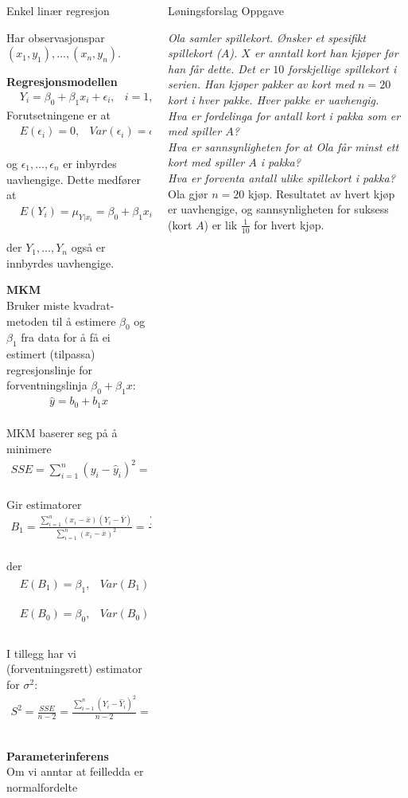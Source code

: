 \documentclass[final,hyperref={pdfpagelabels=false}]{beamer}
\newcommand{\oppgave}[2]
{\center\normalsize Oppgave\\
	{\footnotesize\raggedright \textit{#1}\\#2\\}}
\newcommand{\matte}[1]{\vspace{-3mm}\begin{align*}#1\end{align*}}
\newcommand{\maths}[1]{\vspace{-3mm}\begin{align*}#1\end{align*}\\\vspace{-3mm}}
\newcommand{\tema}[2]{\footnotesize\raggedright\textbf{#1}\\{#2}\par}
\newcommand{\body}[1]{\footnotesize\raggedright{#1}\par}
\newcommand{\subsect}[1]{\center\normalsize{#1}\\}
\begin{document}
\begin{frame}{}
\begin{columns}[t]
\begin{column}{.33\linewidth}
\begin{block}{}
{				}
				\subsect{Enkel linær regresjon}
				\body{Har observasjonspar $(x_1,y_1),\ldots,(x_n,y_n)$.\\}
				\tema{Regresjonsmodellen}
				{\matte{&Y_i=\beta_0+\beta_1x_i+\epsilon_i, &i=1,\ldots,n}
					Forutsetningene er at
					\maths{&E(\epsilon_i)=0,&Var(\epsilon_i)=\sigma^2,& &i=1,\ldots,n}
					og $\epsilon_1,\ldots,\epsilon_n$ er inbyrdes uavhengige. Dette medfører at
					\maths{&E(Y_i)=\mu_{Y|x_i}=\beta_0+\beta_1x_i,&Var(Y_i)=\sigma_{Y|x_i}^2=\sigma^2,& &i=1,\ldots,n}
					der $Y_1,\ldots,Y_n$ også er innbyrdes uavhengige.}
				\tema{MKM}
				{Bruker miste kvadrat-metoden til å estimere $\beta_0$ og $\beta_1$ fra data for å få ei estimert (tilpassa) regresjonslinje for forventningslinja $\beta_0+\beta_1x$:
					\maths{\hat y=b_0+b_1x}
					MKM baserer seg på å minimere
					\maths{SSE=\sum_{i=1}^n(y_i-\hat y_i)^2=\sum_{i=1}^n(y_i-b_0-b_1x_i)^2}
					Gir estimatorer
					\maths{B_1=\frac{\sum_{i=1}^n(x_i-\bar x)(Y_i-\overline{Y})}{\sum_{i=1}^n(x_i-\overline{x})^2}=\frac{\sum_{i=1}^n(x_i-\bar x)Y_i}{\sum_{i=1}^n(x_i-\overline{x})^2}, &B_0=\overline{Y}-B_1\overline{x}}
					der
					\maths{&E(B_1)=\beta_1, &Var(B_1)=\frac{\sigma^2}{\sum_{i=1}^n(x_i-\overline x)^2}\\
						&E(B_0)=\beta_0, &Var(B_0)=\frac{\sigma^2\sum_{i=1}^nx_i^2}{n\sum_{i=1}^n(x_i-\overline{x})^2}}
					I tillegg har vi (forventningsrett) estimator for $\sigma^2$:
					\maths{S^2=\frac{SSE}{n-2}=\frac{\sum_{i=1}^n(Y_i-\hat Y_i)^2}{n-2}=\frac{\sum_{i=1}^n(Y_i-B_0-B_1x_i)^2}{n-2}}}
				\tema{Parameterinferens}
				{Om vi anntar at feilledda er normalfordelte}
			\end{block}
		\end{column}
		\begin{column}{.33\linewidth}
			\begin{block}{Løningsforslag}
				\oppgave{Ola samler spillekort.
					Ønsker et spesifikt spillekort ($A$).
					$X$ er anntall kort han kjøper før han får dette.
					Det er $10$ forskjellige spillekort i serien.
					Han kjøper pakker av kort med $n=20$ kort i hver pakke.
					Hver pakke er uavhengig.\\
					Hva er fordelinga for antall kort i pakka som er med spiller $A$?\\
					Hva er sannsynligheten for at Ola får minst ett kort med spiller $A$ i pakka?\\
					Hva er forventa antall ulike spillekort i pakka?}
				{Ola gjør $n=20$ kjøp.
					Resultatet av hvert kjøp er uavhengige, og sannsynligheten for suksess (kort $A$) er lik $\frac{1}{10}$ for hvert kjøp.
}
\end{block}
\end{column}
\end{columns}
\end{frame}
\end{document}
